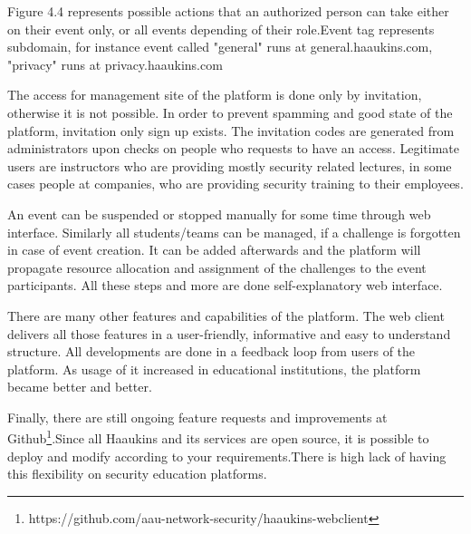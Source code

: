 Figure 4.4 represents possible actions that an authorized person can take either on their event only, or all events depending of their role.Event tag represents subdomain, for instance event called "general" runs at general.haaukins.com, "privacy" runs at privacy.haaukins.com 

The access for management site of the platform is done only by invitation, otherwise it is not possible. In order to prevent spamming and good state of the platform, invitation only sign up exists. The invitation codes are generated from administrators upon checks on people who requests to have an access. Legitimate users are instructors who are providing mostly security related lectures, in some cases people at companies,  who are providing security training to their employees. 

An event can be suspended or stopped manually for some time through web interface. Similarly all students/teams can be managed, if a challenge is forgotten in case of event creation. It can be added afterwards and the platform will propagate resource allocation and assignment of the challenges to the event participants. All these steps and more are done self-explanatory web interface.

There are many other features and capabilities of the platform. The web client delivers all those features in a user-friendly, informative and easy to understand structure. All developments are done in a feedback loop from users of the platform. As usage of it increased in educational institutions, the platform became better and better. 

Finally, there are still ongoing feature requests and improvements at Github\footnote{https://github.com/aau-network-security/haaukins-webclient}.Since all Haaukins and its services are open source, it is possible to deploy and modify according to your requirements.There is high lack of having this flexibility on security education platforms. 



